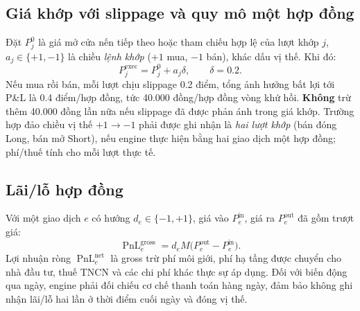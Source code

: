 \documentclass[12pt,a4paper,oneside]{article}
\newcommand{\PnL}{\operatorname{PnL}}
\begin{document}
\subsection{Giá khớp với slippage và quy mô một hợp đồng}
Đặt $P_j^0$ là giá mở cửa nến tiếp theo hoặc tham chiếu hợp lệ của lượt khớp $j$, $a_j\in\{+1,-1\}$ là chiều \emph{lệnh khớp} ($+1$ mua, $-1$ bán), khác dấu vị thế. Khi đó:
\begin{equation}\label{eq:fill}
P_j^{\mathrm{exec}}=P_j^0+a_j\delta,\qquad\delta=0.2.
\end{equation}
Nếu mua rồi bán, mỗi lượt chịu slippage 0.2 điểm, tổng ảnh hưởng bất lợi tới P\&L là 0.4 điểm/hợp đồng, tức 40.000 đồng/hợp đồng vòng khứ hồi. \textbf{Không} trừ thêm 40.000 đồng lần nữa nếu slippage đã được phản ánh trong giá khớp. Trường hợp đảo chiều vị thế $+1\to-1$ phải được ghi nhận là \emph{hai lượt khớp} (bán đóng Long, bán mở Short), nếu engine thực hiện bằng hai giao dịch một hợp đồng; phí/thuế tính cho mỗi lượt thực tế.

\subsection{Lãi/lỗ hợp đồng}
Với một giao dịch $e$ có hướng $d_e\in\{-1,+1\}$, giá vào $P_e^{\mathrm{in}}$, giá ra $P_e^{\mathrm{out}}$ đã gồm trượt giá:
\begin{equation}
\PnL_e^{\mathrm{gross}}=d_e M\big(P_e^{\mathrm{out}}-P_e^{\mathrm{in}}\big).
\end{equation}
Lợi nhuận ròng $\PnL_e^{\mathrm{net}}$ là gross trừ phí môi giới, phí hạ tầng được chuyển cho nhà đầu tư, thuế TNCN và các chi phí khác thực sự áp dụng. Đối với biến động qua ngày, engine phải đối chiếu cơ chế thanh toán hàng ngày, đảm bảo không ghi nhận lãi/lỗ hai lần ở thời điểm cuối ngày và đóng vị thế.
\end{document}
